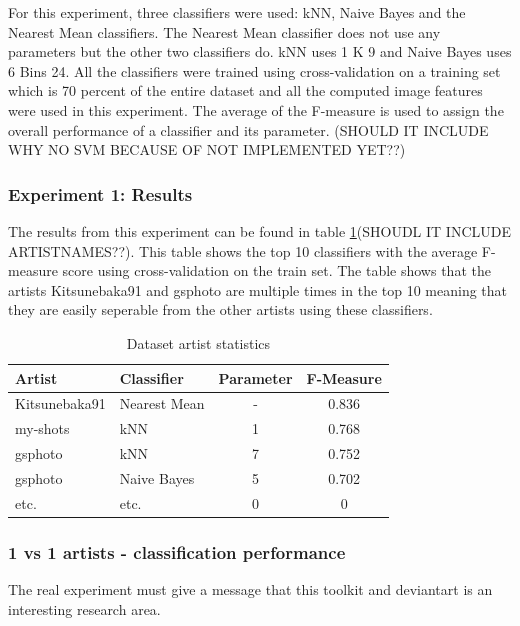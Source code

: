 For this experiment, three classifiers were used: kNN, Naive Bayes and the Nearest Mean classifiers.
The Nearest Mean classifier does not use any parameters but the other two classifiers do.
kNN uses 1 K 9 and Naive Bayes uses 6 Bins 24.
All the classifiers were trained using cross-validation on a training set which is 70 percent of the entire dataset and all the computed image features were used in this experiment.
The average of the F-measure is used to assign the overall performance of a classifier and its parameter.
(SHOULD IT INCLUDE WHY NO SVM BECAUSE OF NOT IMPLEMENTED YET??)

\subsubsection{Experiment 1: Results}
The results from this experiment can be found in table \ref{ex1results}(SHOUDL IT INCLUDE ARTISTNAMES??). This table shows the top 10 classifiers with the average F-measure score using cross-validation on the train set. 
The table shows that the artists Kitsunebaka91 and gsphoto are multiple times in the top 10 meaning that they are easily seperable from the other artists using these classifiers.


\begin{table}
    \centering
    \begin{tabular}
        { | l | l | c | c } 
        \hline
        Artist & Classifier & Parameter & F-Measure \\
        \hline
        Kitsunebaka91 & Nearest Mean & - & 0.836  \\ 
        my-shots & kNN & 1 & 0.768 \\ 
        gsphoto & kNN & 7 & 0.752 \\ 
        gsphoto & Naive Bayes & 5 & 0.702 \\ 
        etc. & etc. & 0 & 0 \\
        \hline 
    \end{tabular}
    \caption{Dataset artist statistics}
    \label{ex1results}
\end{table}


\subsubsection{1 vs 1 artists - classification performance}
The real experiment must give a message that this toolkit and deviantart is an interesting research area.

